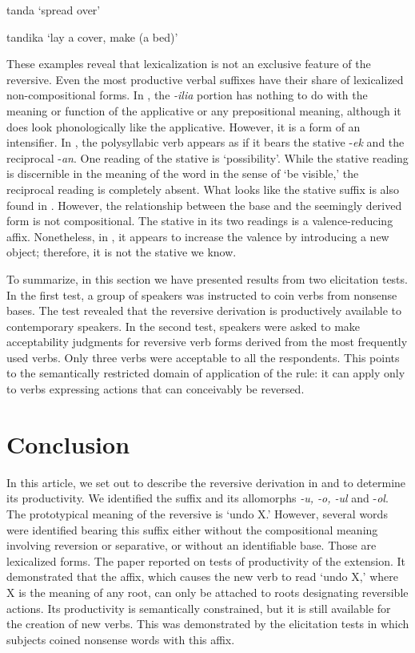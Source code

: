 \documentclass[output=paper]{langsci/langscibook}
\begin{document}
\ea\label{ex:ngonyaningowa:13}
\ea\label{ex:ngonyaningowa:13a}
tanda  ‘spread over’

\ex\label{ex:ngonyaningowa:13b}  
tandika ‘lay a cover, make (a bed)’
\z 
\z

These examples reveal that lexicalization is not an exclusive feature of the reversive. Even the most productive verbal suffixes have their share of lexicalized non-composi\-tion\-al forms. In , the \textit{-ilia} portion has nothing to do with the meaning or function of the applicative or any prepositional meaning, although it does look phonologically like the applicative. However, it is a form of an intensifier. In , the polysyllabic verb appears as if it bears the stative -\textit{ek} and the reciprocal -\textit{an}. One reading of the stative is ‘possibility’. While the stative reading is discernible in the meaning of the word in the sense of ‘be visible,’ the reciprocal reading is completely absent. What looks like the stative suffix is also found in . However, the relationship between the base  and the seemingly derived form  is not compositional. The stative in its two readings is a valence-reducing affix. Nonetheless, in , it appears to increase the valence by introducing a new object; therefore, it is not the stative we know. 

To summarize, in this section we have presented results from two elicitation tests. In the first test, a group of speakers was instructed to coin verbs from nonsense bases. The test revealed that the reversive derivation is productively available to contemporary  speakers. In the second test, speakers were asked to make acceptability judgments for reversive verb forms derived from the most frequently used verbs. Only three verbs were acceptable to all the respondents. This points to the semantically restricted domain of application of the rule: it can apply only to verbs expressing actions that can conceivably be reversed.

\section{Conclusion}\label{sec:ngonyaningowa:6}

In this article, we set out to describe the reversive derivation in  and to determine its productivity. We identified the suffix and its allomorphs \textit{-u, -o, -ul} and  -\textit{ol}. The prototypical meaning of the reversive is ‘undo X.’ However, several words were identified bearing this suffix either without the compositional meaning involving reversion or separative, or without an identifiable base. Those are lexicalized forms. The paper reported on tests of productivity of the extension. It demonstrated that the affix, which causes the new verb to read ‘undo X,’ where X is the meaning of any root, can only be attached to roots designating reversible actions. Its productivity is semantically constrained, but it is still available for the creation of new verbs. This was demonstrated by the elicitation tests in which subjects coined nonsense words with this affix. 
\end{document}
